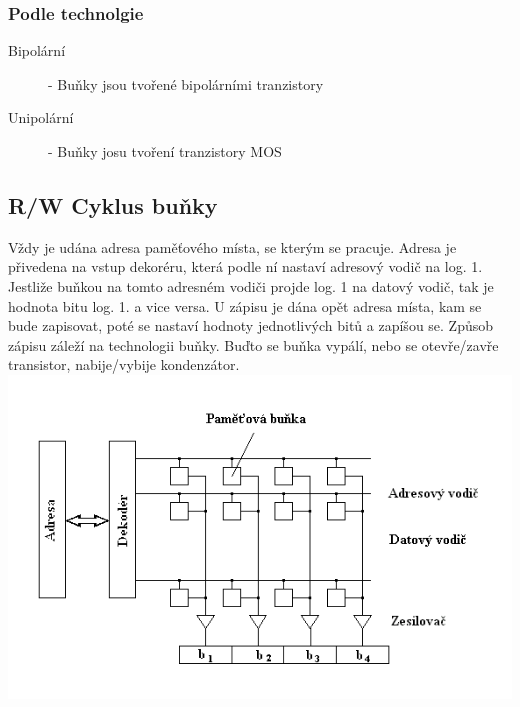 \subsubsection{Podle technolgie}
\begin{description}
  \item[Bipolární] - Buňky jsou tvořené bipolárními tranzistory
  \item[Unipolární] - Buňky josu tvoření tranzistory MOS
\end{description}
\subsection{R/W Cyklus buňky}
Vždy je udána adresa paměťového místa, se kterým se pracuje.
Adresa je přivedena na vstup dekoréru, která podle ní nastaví adresový vodič na log. 1.
Jestliže buňkou na tomto adresném vodiči projde log. 1 na datový vodič, tak je hodnota bitu log. 1. a vice versa.
U zápisu je dána opět adresa místa, kam se bude zapisovat, poté se nastaví hodnoty jednotlivých bitů a zapíšou se.
Způsob zápisu záleží na technologii buňky.
Buďto se buňka vypálí, nebo se otevře/zavře transistor, nabije/vybije kondenzátor.\\
\includegraphics[width=\linewidth]{TVY-POS/Polovodicove-pameti/memorystructure.png}